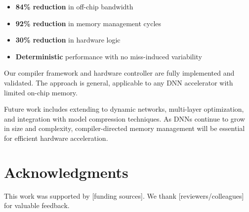 \documentclass[conference]{IEEEtran}
\begin{document}
\begin{itemize}
\item \textbf{84\% reduction} in off-chip bandwidth
\item \textbf{92\% reduction} in memory management cycles
\item \textbf{30\% reduction} in hardware logic
\item \textbf{Deterministic} performance with no miss-induced variability
\end{itemize}

Our compiler framework and hardware controller are fully implemented and validated. The approach is general, applicable to any DNN accelerator with limited on-chip memory.

Future work includes extending to dynamic networks, multi-layer optimization, and integration with model compression techniques. As DNNs continue to grow in size and complexity, compiler-directed memory management will be essential for efficient hardware acceleration.

\section*{Acknowledgments}

This work was supported by [funding sources]. We thank [reviewers/colleagues] for valuable feedback.
\end{document}
